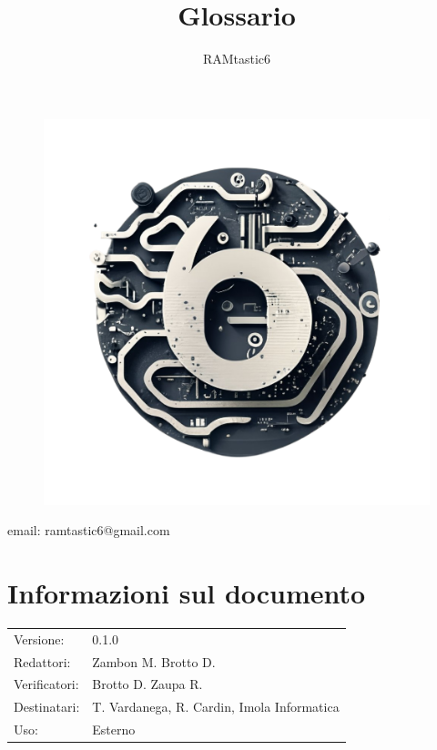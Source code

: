 \documentclass[12pt, oneside]{article}
\author{RAMtastic6}
\begin{document}
\thispagestyle{empty}
\title{Glossario}
\maketitle
\begin{figure}[h]
  \centering
  \includegraphics[scale=0.3]{logo.png}
\end{figure}
\begin{center}
    email: ramtastic6@gmail.com
\end{center}

\section*{Informazioni sul documento}
\begin{tabular}{ll}
Versione: & 0.1.0 \\
Redattori:  & Zambon M. Brotto D.\\
Verificatori: & Brotto D. Zaupa R.\\ 
Destinatari: & T. Vardanega, R. Cardin, Imola Informatica \\
Uso: & Esterno
\end{tabular}
\newpage

\end{document}
